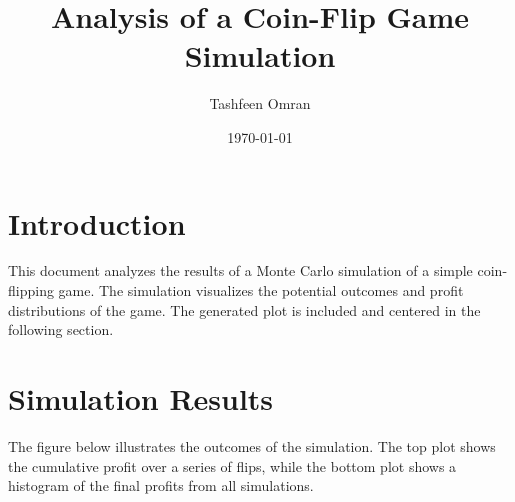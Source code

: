 \documentclass{article}
\title{Analysis of a Coin-Flip Game Simulation}
\author{Tashfeen Omran}
\date{\today}
\begin{document}
\maketitle

\section{Introduction}

This document analyzes the results of a Monte Carlo simulation of a simple coin-flipping game. The simulation visualizes the potential outcomes and profit distributions of the game. The generated plot is included and centered in the following section.

\section{Simulation Results}

The figure below illustrates the outcomes of the simulation. The top plot shows the cumulative profit over a series of flips, while the bottom plot shows a histogram of the final profits from all simulations.
\end{document}
